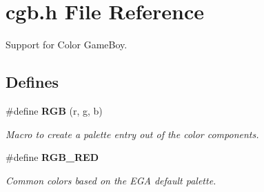 \section{cgb.h File Reference}
\label{cgb.h}
Support for Color Game\-Boy. 


\subsection*{Defines}
\begin{CompactItemize}
\item 
\label{cgb.h_a0}
\#define {\bf RGB} (r, g, b) 
\begin{CompactList}\small\item\em Macro to create a palette entry out of the color components.\item\end{CompactList}

\item 
\label{cgb.h_a1}
\#define {\bf RGB\_\-RED}
\begin{CompactList}\small\item\em Common colors based on the EGA default palette.\item\end{CompactList}

\end{CompactItemize}
